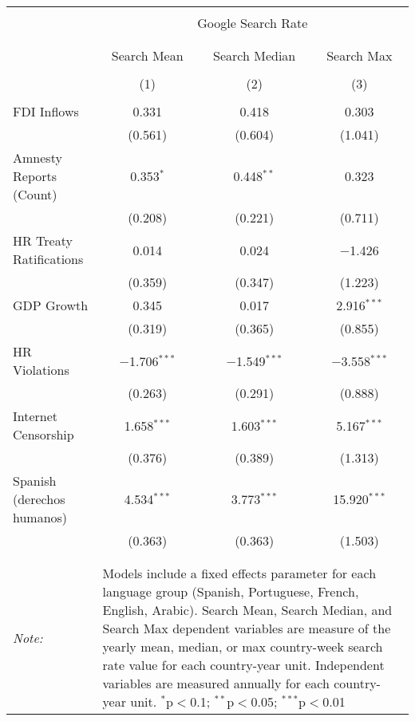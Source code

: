 
\begin{table}[!htbp] \centering 
  \caption{} 
  \label{} 
\begin{tabular}{@{\extracolsep{5pt}}lccc} 
\\[-1.8ex]\hline 
\hline \\[-1.8ex] 
 & \multicolumn{3}{c}{Google Search Rate} \\ 
\cline{2-4} 
\\[-1.8ex] & \multicolumn{3}{c}{ } \\ 
 & Search Mean & Search Median & Search Max \\ 
\\[-1.8ex] & (1) & (2) & (3)\\ 
\hline \\[-1.8ex] 
 FDI Inflows & 0.331 & 0.418 & 0.303 \\ 
  & (0.561) & (0.604) & (1.041) \\ 
  Amnesty Reports (Count) & 0.353$^{*}$ & 0.448$^{**}$ & 0.323 \\ 
  & (0.208) & (0.221) & (0.711) \\ 
  HR Treaty Ratifications & 0.014 & 0.024 & $-$1.426 \\ 
  & (0.359) & (0.347) & (1.223) \\ 
  GDP Growth & 0.345 & 0.017 & 2.916$^{***}$ \\ 
  & (0.319) & (0.365) & (0.855) \\ 
  HR Violations & $-$1.706$^{***}$ & $-$1.549$^{***}$ & $-$3.558$^{***}$ \\ 
  & (0.263) & (0.291) & (0.888) \\ 
  Internet Censorship & 1.658$^{***}$ & 1.603$^{***}$ & 5.167$^{***}$ \\ 
  & (0.376) & (0.389) & (1.313) \\ 
  Spanish (derechos humanos) & 4.534$^{***}$ & 3.773$^{***}$ & 15.920$^{***}$ \\ 
  & (0.363) & (0.363) & (1.503) \\ 
 \hline \\[-1.8ex] 
\hline 
\hline \\[-1.8ex] 
\textit{Note:}  & \multicolumn{3}{l}{\parbox[t]{8cm}{Models include a fixed effects parameter for each language group (Spanish, Portuguese, French, English, Arabic). Search Mean, Search Median, and Search Max dependent variables are measure of the yearly mean, median, or max country-week search rate value for each country-year unit. Independent variables are measured annually for each country-year unit. $^{*}$p$<$0.1; $^{**}$p$<$0.05; $^{***}$p$<$0.01}} \\ 
\end{tabular} 
\end{table} 
